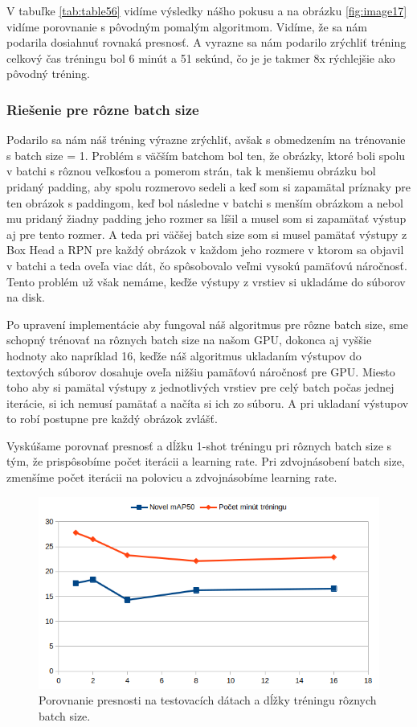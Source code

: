 V tabuľke \ref{tab:table56} vidíme výsledky nášho pokusu a na obrázku \ref{fig:image17} vidíme porovnanie s pôvodným pomalým algoritmom. Vidíme, že sa nám podarila dosiahnuť rovnaká presnosť. A vyrazne sa nám podarilo zrýchliť tréning celkový čas tréningu bol 6 minút a 51 sekúnd, čo je je takmer 8x rýchlejšie ako pôvodný tréning.

\subsubsection{Riešenie pre rôzne batch size}

Podarilo sa nám náš tréning výrazne zrýchliť, avšak s obmedzením na trénovanie s batch size = 1. Problém s väčším batchom bol ten, že obrázky, ktoré boli spolu v batchi s rôznou veľkosťou a pomerom strán, tak k menšiemu obrázku bol pridaný padding, aby spolu rozmerovo sedeli a keď som si zapamätal príznaky pre ten obrázok s paddingom, keď bol následne v batchi s menším obrázkom a nebol mu pridaný žiadny padding jeho rozmer sa líšil a musel som si zapamätať výstup aj pre tento rozmer. A teda pri väčšej batch size som si musel pamätať výstupy z Box Head a RPN pre každý obrázok v každom jeho rozmere v ktorom sa objavil v batchi a teda oveľa viac dát, čo spôsobovalo veľmi vysokú pamäťovú náročnosť. Tento problém už však nemáme, keďže výstupy z vrstiev si ukladáme do súborov na disk.

Po upravení implementácie aby fungoval náš algoritmus pre rôzne batch size, sme schopný trénovať na rôznych batch size na našom GPU, dokonca aj vyššie hodnoty ako napríklad 16, keďže náš algoritmus ukladaním výstupov do textových súborov dosahuje oveľa nižšiu pamäťovú náročnosť pre GPU. Miesto toho aby si pamätal výstupy z jednotlivých vrstiev pre celý batch počas jednej iterácie, si ich nemusí pamätať a načíta si ich zo súboru. A pri ukladaní výstupov to robí postupne pre každý obrázok zvlášť.

Vyskúšame porovnať presnosť a dĺžku 1-shot tréningu pri rôznych batch size s tým, že prispôsobíme počet iterácii a learning rate. Pri zdvojnásobení batch size, zmenšíme počet iterácii na polovicu a zdvojnásobíme learning rate. 

\begin{figure}[H]
\centering
\includegraphics[width=\textwidth]{images/diff_batch_size.png}
\caption{Porovnanie presnosti na testovacích dátach a dĺžky tréningu rôznych batch size.}
\label{fig:diff_batch_size}
\end{figure}

